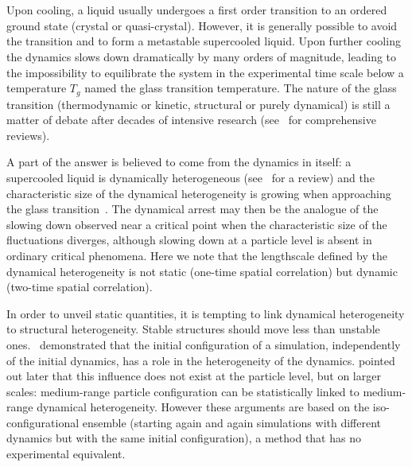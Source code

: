 \section*{}

Upon cooling, a liquid usually undergoes a first order transition to an ordered ground state (crystal or quasi-crystal). However, it is generally possible to avoid the transition and to form a metastable supercooled liquid. Upon further cooling the dynamics slows down dramatically by many orders of magnitude, leading to the impossibility to equilibrate the system in the experimental time scale below a temperature $T_g$ named the glass transition temperature. The nature of the glass transition (thermodynamic or kinetic, structural or purely dynamical) is still a matter of debate after decades of intensive research (see~\citep{cavagna2009supercooled,BerthierR} for comprehensive reviews).

A part of the answer is believed to come from the dynamics in itself: a supercooled liquid is dynamically heterogeneous (see~\citep{BerthierR} for a review) and the characteristic size of the dynamical heterogeneity is growing when approaching the glass transition~\citep{yamamoto1998, Donati1999a}. The dynamical arrest may then be the analogue of the slowing down observed near a critical point when the characteristic size of the fluctuations diverges, although slowing down at a particle level is absent in ordinary critical phenomena. Here we note that the lengthscale defined by the dynamical heterogeneity is not static (one-time spatial correlation) but dynamic (two-time spatial correlation). 

In order to unveil static quantities, it is tempting to link dynamical heterogeneity to structural heterogeneity. Stable structures should move less than unstable ones.~\citet{Widmer-Cooper2005} demonstrated that the initial configuration of a simulation, independently of the initial dynamics, has a role in the heterogeneity of the dynamics. \citet{Berthier2007} pointed out later that this influence does not exist at the particle level, but on larger scales: medium-range particle configuration can be statistically linked to medium-range dynamical heterogeneity. However these arguments are based on the iso-configurational ensemble (starting again and again simulations with different dynamics but with the same initial configuration), a method that has no experimental equivalent.


